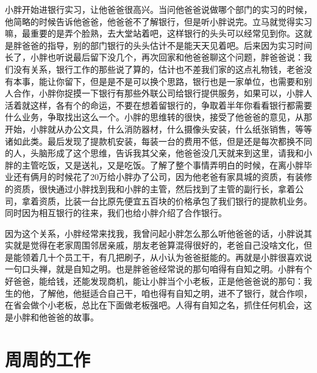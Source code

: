 小胖开始进银行实习，让他爸爸很高兴。当问他爸爸说做哪个部门的实习的时候，他简略的时候告诉他爸爸，他爸爸不了解银行，但是听小胖说完。立马就觉得实习嘛，最重要的是弄个脸熟，去大堂站着吧，这样银行的头头可以经常见到你。这就是胖爸爸的指导，别的部门银行的头头估计不是能天天见着吧。后来因为实习时间长了，小胖也听说最后留下没几个，再次回家和他爸爸聊这个问题，胖爸爸说：我们没有关系，银行工作的那些说了算的，估计也不差我们家的这点礼物钱，老爸没有本事，能让你留下，但是是不是可以换个思路，银行也是一家单位，也需要和别人合作，小胖你捉摸一下银行有那些外联公司给银行提供服务，如果可以，小胖人活着就这样，各有个的命运，不要在想着留银行的，争取着半年你看看银行都需要什么业务，争取找出这么一个。小胖的思维转的很快，接受了他爸爸的意见，从那开始，小胖就从办公文具，什么消防器材，什么摄像头安装，什么纸张销售，等等诸如此类。最后发现了提款机安装，每装一台的费用不低，但是还是每次都换不同的人，头脑形成了这个思维，告诉我其父亲，他爸爸没几天就来到这里，请我和小胖的主管吃饭，又是送礼，又是吃饭。了解了整个事情弄明白的时候，在离小胖毕业还有俩月的时候花了20万给小胖办了公司，因为他老爸有家具城的资质，有装修的资质，很快通过小胖找到我和小胖的主管，然后找到了主管的副行长，拿着公司，拿着资质，比装一台比原先便宜五百块的价格承包了我们银行的提款机业务。同时因为相互银行的往来，我们也给小胖介绍了合作银行。

因为这个关系，小胖经常来找我，我曾问起小胖怎么那么听他爸爸的话，小胖说其实就是觉得在老家周围邻居亲戚，朋友老爸算混得很好的，老爸自己没啥文化，但是能领着几十个员工干，有几把刷子，从小认为爸爸挺能的。再就是小胖很喜欢说一句口头禅，就是自知之明。也是胖爸爸经常说的那句咱得有自知之明。小胖有个好爸爸，能给钱，还能发现商机，能让小胖当个小老板，正是他爸爸说的那句：我生的他，了解他，他挺适合自己干，咱也得有自知之明，进不了银行，就合作呗，在省会做个小老板，总比在下面做老板强吧。人得有自知之名，抓住任何机会，这是小胖和他爸爸的故事。

\section{周周的工作}


